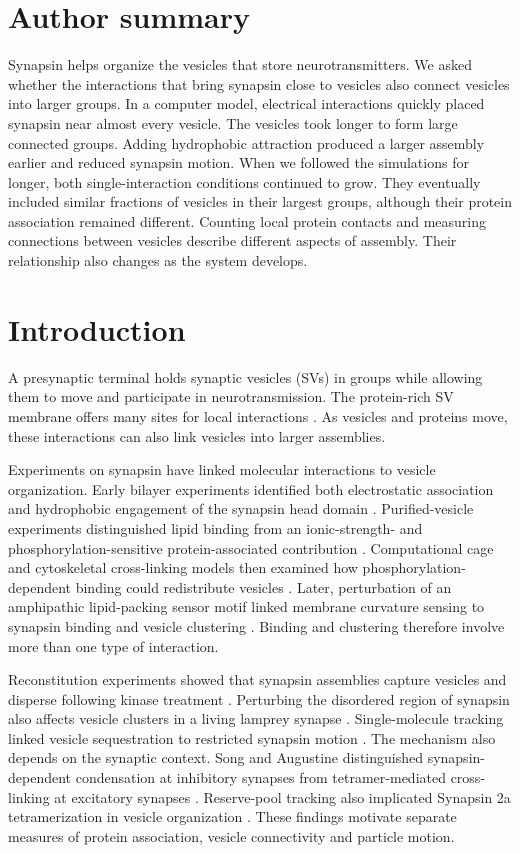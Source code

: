 \documentclass[11pt,letterpaper]{article}
\begin{document}
\section*{Author summary}
Synapsin helps organize the vesicles that store neurotransmitters. We
asked whether the interactions that bring synapsin close to vesicles also
connect vesicles into larger groups. In a computer model, electrical
interactions quickly placed synapsin near almost every vesicle. The
vesicles took longer to form large connected groups. Adding hydrophobic
attraction produced a larger assembly earlier and reduced synapsin
motion. When we followed the simulations for longer, both
single-interaction conditions continued to grow. They eventually included
similar fractions of vesicles in their largest groups, although their
protein association remained different. Counting local protein contacts
and measuring connections between vesicles describe different aspects
of assembly. Their relationship also changes as the system develops.

\section{Introduction}
A presynaptic terminal holds synaptic vesicles (SVs) in groups while
allowing them to move and participate in neurotransmission. The protein-rich
SV membrane offers many sites for local interactions \cite{Takamori2006}.
As vesicles and proteins move, these interactions can also link vesicles
into larger assemblies.

Experiments on synapsin have linked molecular interactions to vesicle
organization. Early bilayer experiments identified both electrostatic
association and hydrophobic engagement of the synapsin head domain
\cite{BenfenatiBilayers1989}. Purified-vesicle experiments distinguished
lipid binding from an ionic-strength- and phosphorylation-sensitive
protein-associated contribution \cite{BenfenatiSV1989}. Computational
cage and cytoskeletal cross-linking models then examined how
phosphorylation-dependent binding could redistribute vesicles
\cite{Benfenati1991}. Later, perturbation of an amphipathic lipid-packing
sensor motif linked membrane curvature sensing to synapsin binding and
vesicle clustering \cite{Krabben2011}. Binding and clustering therefore
involve more than one type of interaction.

Reconstitution experiments showed that synapsin assemblies capture
vesicles and disperse following kinase treatment \cite{Milovanovic2018}.
Perturbing the disordered region of synapsin also affects vesicle clusters
in a living lamprey synapse \cite{Pechstein2020}. Single-molecule tracking
linked vesicle sequestration to restricted synapsin motion
\cite{Hoffmann2023}. The mechanism also depends on the synaptic context.
Song and Augustine distinguished synapsin-dependent condensation at
inhibitory synapses from tetramer-mediated cross-linking at excitatory
synapses \cite{Song2023}. Reserve-pool tracking also implicated Synapsin 2a
tetramerization in vesicle organization \cite{Longfield2024}. These
findings motivate separate measures of protein association, vesicle
connectivity and particle motion.
\end{document}
